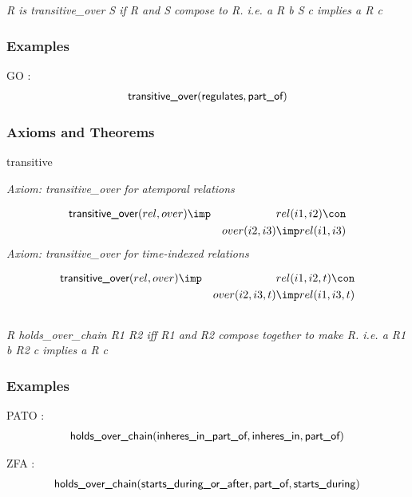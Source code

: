 \subsection{ }
\emph{R is transitive\_over S if R and S compose to R. i.e. a R b S c implies a R c}

\subsubsection{Examples}
\begin{clist}
\item GO : \begin{eqnarray*}
 \mbox{\sf transitive\_over}( \mbox{\sf regulates},  \mbox{\sf part\_of}) 
\end{eqnarray*}

\end{clist}

\subsubsection{Axioms and Theorems}

\begin{clist}
\item transitive
\end{clist}

\emph{Axiom: transitive\_over for atemporal relations}

\begin{eqnarray*}
 \pr{transitive\_over}(rel, over) &\imp &rel(i1, i2) \con \\
&&over(i2, i3) \imp rel(i1, i3) 
\end{eqnarray*}
\emph{Axiom: transitive\_over for time-indexed relations}

\begin{eqnarray*}
 \pr{transitive\_over}(rel, over) &\imp &rel(i1, i2, t) \con \\
&&over(i2, i3, t) \imp rel(i1, i3, t) 
\end{eqnarray*}

\subsection{ }
\emph{R holds\_over\_chain R1 R2 iff R1 and R2 compose together to make R. i.e. a R1 b R2 c implies a R c}

\subsubsection{Examples}
\begin{clist}
\item PATO : \begin{eqnarray*}
 \mbox{\sf holds\_over\_chain}( \mbox{\sf inheres\_in\_part\_of},  \mbox{\sf inheres\_in},  \mbox{\sf part\_of}) 
\end{eqnarray*}

\item ZFA : \begin{eqnarray*}
 \mbox{\sf holds\_over\_chain}( \mbox{\sf starts\_during\_or\_after},  \mbox{\sf part\_of},  \mbox{\sf starts\_during}) 
\end{eqnarray*}

\end{clist}

